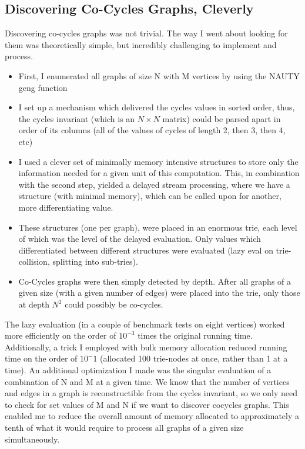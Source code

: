 \subsection{Discovering Co-Cycles Graphs, Cleverly}

Discovering co-cycles graphs was not trivial.
The way I went about looking for them was theoretically simple, but incredibly challenging to implement and process.
\begin{itemize}
\item{First, I enumerated all graphs of size N with M vertices by using the NAUTY geng function}
\item{I set up a mechanism which delivered the cycles values in sorted order, thus, the cycles invariant (which is an $N \times N$ matrix) could be parsed apart in order of its columns (all of the values of cycles of length 2, then 3, then 4, etc)}
\item{I used a clever set of minimally memory intensive structures to store only the information needed for a given unit of this computation.  This, in combination with the second step, yielded a delayed stream processing, where we have a structure (with minimal memory), which can be called upon for another, more differentiating value.}
\item{These structures (one per graph), were placed in an enormous trie, each level of which was the level of the delayed evaluation.  Only values which differentiated between different structures were evaluated (lazy eval on trie-collision, splitting into sub-tries).}
\item{Co-Cycles graphs were then simply detected by depth. After all graphs of a given size (with a given number of edges) were placed into the trie, only those at depth $N^2$ could possibly be co-cycles.}
\end{itemize}

The lazy evaluation (in a couple of benchmark tests on eight vertices) worked more efficiently on the order of $10^{-3}$ times the original running time.
Additionally, a trick I employed with bulk memory allocation reduced running time on the order of $10^-1$ (allocated 100 trie-nodes at once, rather than 1 at a time).
An additional optimization I made was the singular evaluation of a combination of N and M at a given time.
We know that the number of vertices and edges in a graph is reconstructible from the cycles invariant, so we only need to check for set values of M and N if we want to discover cocycles graphs.
This enabled me to reduce the overall amount of memory allocated to approximately a tenth of what it would require to process all graphs of a given size simultaneously.

